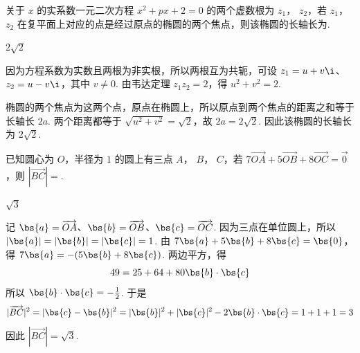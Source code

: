 \begin{problem}
关于 \( x \) 的实系数一元二次方程 \( x^2 + px + 2 = 0 \) 的两个虚数根为 \( z_1 \)， \( z_2 \)，若 \( z_1 \)， \( z_2 \) 在复平面上对应的点是经过原点的椭圆的两个焦点，则该椭圆的长轴长为\fillinblank{}.

\begin{answer}
\(2\sqrt2\)
\end{answer}

\begin{solution}
因为方程系数为实数且两根为非实根，所以两根互为共轭，可设 \(z_1=u+v\i\)、\(z_2=u-v\i\)，其中 \(v\neq0\). 由韦达定理 \(z_1z_2=2\)，得 \(u^2+v^2=2\).

椭圆的两个焦点为这两个点，原点在椭圆上，所以原点到两个焦点的距离之和等于长轴长 \(2a\). 两个距离都等于 \(\sqrt{u^2+v^2}=\sqrt2\)，故 \(2a=2\sqrt2\). 因此该椭圆的长轴长为 \(2\sqrt2\).
\end{solution}
\end{problem}

\begin{problem}
已知圆心为 \(O\)，半径为 \(1\) 的圆上有三点 \(A\)， \(B\)， \(C\)，若 \( 7\overrightarrow{OA} + 5\overrightarrow{OB} + 8\overrightarrow{OC} = \overrightarrow{0} \)，则 \( \left|\overrightarrow{BC}\right|= \)\fillinblank{}.

\begin{answer}
\(\sqrt3\)
\end{answer}

\begin{solution}
记 \(\bs{a}=\overrightarrow{OA}\)、\(\bs{b}=\overrightarrow{OB}\)、\(\bs{c}=\overrightarrow{OC}\). 因为三点在单位圆上，所以 \(|\bs{a}|=|\bs{b}|=|\bs{c}|=1\). 由 \(7\bs{a}+5\bs{b}+8\bs{c}=\bs{0}\)，得 \(7\bs{a}=-(5\bs{b}+8\bs{c})\). 两边平方，得
\[
49=25+64+80\bs{b}\cdot\bs{c}
\]
所以 \(\bs{b}\cdot\bs{c}=-\frac12\). 于是
\[
|\overrightarrow{BC}|^2=|\bs{c}-\bs{b}|^2=|\bs{b}|^2+|\bs{c}|^2-2\bs{b}\cdot\bs{c}=1+1+1=3
\]
因此 \(|\overrightarrow{BC}|=\sqrt3\).
\end{solution}
\end{problem}

